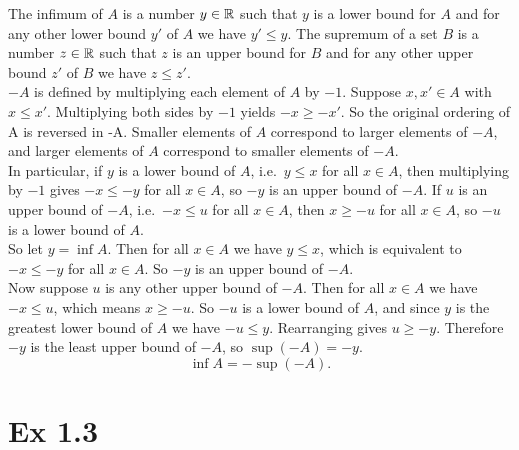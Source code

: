 \documentclass{report}
\begin{document}
\begin{proofWithHibiscus}
  The infimum of $A$ is a number $y \in \mathbb{R}$ such that $y$ is a lower bound for $A$ and for any other lower bound $y'$ of $A$ we have $y' \leq y$. The supremum of a set $B$ is a number $z \in \mathbb{R}$ such that $z$ is an upper bound for $B$ and for any other upper bound $z'$ of $B$ we have $z \leq z'$.  \\

  $-A$ is defined by multiplying each element of $A$ by $-1$. Suppose $x, x' \in A$ with $x \leq x'$. Multiplying both sides by $-1$ yields $-x \geq -x'$. So the original ordering of A is reversed in -A. Smaller elements of $A$ correspond to larger elements of $-A$, and larger elements of $A$ correspond to smaller elements of $-A$. \\

  In particular, if $y$ is a lower bound of $A$, i.e.\ $y \leq x$ for all $x \in A$, then multiplying by $-1$ gives $-x \leq -y$ for all $x \in A$, so $-y$ is an upper bound of $-A$. If $u$ is an upper bound of $-A$, i.e.\ $-x \leq u$ for all $x \in A$, then $x \geq -u$ for all $x \in A$, so $-u$ is a lower bound of $A$. \\

  So let $y = \inf A$. Then for all $x \in A$ we have $y \leq x$, which is equivalent to $-x \leq -y$ for all $x \in A$. So $-y$ is an upper bound of $-A$. \\

  Now suppose $u$ is any other upper bound of $-A$. Then for all $x \in A$ we have $-x \leq u$, which means $x \geq -u$. So $-u$ is a lower bound of $A$, and since $y$ is the greatest lower bound of $A$ we have $-u \leq y$. Rearranging gives $u \geq -y$. Therefore $-y$ is the least upper bound of $-A$, so $\sup(-A) = -y$. \\
  \[
  \inf A = -\sup(-A).
  \]
\end{proofWithHibiscus}

  

\section*{Ex 1.3}

\end{document}
